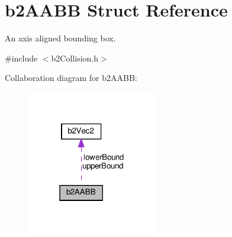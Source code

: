 \hypertarget{structb2AABB}{}\section{b2\+A\+A\+BB Struct Reference}
\label{structb2AABB}


An axis aligned bounding box.  




{\ttfamily \#include $<$b2\+Collision.\+h$>$}



Collaboration diagram for b2\+A\+A\+BB\+:
\nopagebreak
\begin{figure}[H]
\begin{center}
\leavevmode
\includegraphics[width=162pt]{structb2AABB__coll__graph}
\end{center}
\end{figure}
